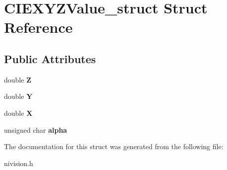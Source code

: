 \hypertarget{structCIEXYZValue__struct}{\section{\-C\-I\-E\-X\-Y\-Z\-Value\-\_\-struct \-Struct \-Reference}
\label{structCIEXYZValue__struct}
}
\subsection*{\-Public \-Attributes}
\begin{DoxyCompactItemize}
\item 
\hypertarget{structCIEXYZValue__struct_a64baa30848c89350d473d7129b1a26cc}{double {\bfseries \-Z}}\label{structCIEXYZValue__struct_a64baa30848c89350d473d7129b1a26cc}

\item 
\hypertarget{structCIEXYZValue__struct_a0bec3491b0e4eff1f583752345fca2d4}{double {\bfseries \-Y}}\label{structCIEXYZValue__struct_a0bec3491b0e4eff1f583752345fca2d4}

\item 
\hypertarget{structCIEXYZValue__struct_a95a67b9cddbde6537326b42acda21fb7}{double {\bfseries \-X}}\label{structCIEXYZValue__struct_a95a67b9cddbde6537326b42acda21fb7}

\item 
\hypertarget{structCIEXYZValue__struct_a9ed64a23d999c394e7498e9d6c065f82}{unsigned char {\bfseries alpha}}\label{structCIEXYZValue__struct_a9ed64a23d999c394e7498e9d6c065f82}

\end{DoxyCompactItemize}


\-The documentation for this struct was generated from the following file\-:\begin{DoxyCompactItemize}
\item 
nivision.\-h\end{DoxyCompactItemize}
